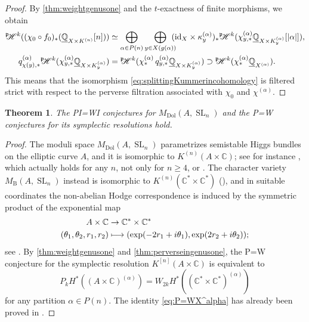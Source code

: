 \documentclass[JEP,XML,SOM,Unicode, NoEqCountersInSection,NoFloatCountersInSection,published]{cedram}
\let\mathcal\mathscr
\newcommand\mto{\mathchoice{\longmapsto}{\mapsto}{\mapsto}{\mapsto}}
\newcommand{\pcH}{{^{\mathfrak{p}}\!\!}\mathcal{H}}
\newtheorem{thm}{Theorem}[section]
\theoremstyle{definition}
\newcommand{\CC}{\mathbb{C}}
\newcommand{\QQ}{\mathbb{Q}}
\newcommand{\Sl}{\operatorname{SL}}
\newcommand{\MDolSlone}{{M}_{\mathrm{Dol}}(A, \Sl_n)}
\newcommand{\MBSlone}{{M}_{\mathrm{B}}(A, \Sl_n)}
\begin{document}
\begin{proof} By \cref{thm:weightgenusone} and the $t$-exactness of finite morphisms, we obtain
\begin{align*}
\pcH^{k}((\chi_0 \circ f_0)_* (\underline{\QQ}_{X \times K^{(n)}}[n])) &\simeq  \bigoplus_{\alpha \in P(n)} \bigoplus_{y \in X(g(\alpha))}\hspace*{-2mm} (\mathrm{id}_X \times \kappa^{(\alpha)}_y)_* \pcH^{k} (\chi^{(\alpha)}_{y,*}\underline{\QQ}_{X \times K^{(\alpha)}_y}[|\alpha|]),
\\
q^{(\alpha)}_{\chi(y), *}\pcH^{k}(\chi^{(\alpha)}_{y,*}\underline{\QQ}_{X \times K^{(\alpha)}_y}) &= \pcH^{k}(\chi^{(\alpha)}_{ *} \,q^{(\alpha)}_{y, *}\underline{\QQ}_{X \times K^{(\alpha)}_y}) \supset \pcH^{k}(\chi^{(\alpha)}_{ *} \underline{\QQ}_{X^{(\alpha)}}).
\end{align*}
This means that the isomorphism \eqref{eq:splittingKummerincohomology} is filtered strict with respect to the perverse filtration associated with $\chi_0$ and $\chi^{(\alpha)}$.
\end{proof}

\begin{thm}\label{thm:PI=IWgenusone}
The PI=WI conjectures for $\MDolSlone$ and the P=W conjectures for its symplectic resolutions hold.
\end{thm}
\begin{proof}
The moduli space $\MDolSlone$ parametrizes semistable Higgs bundles on the elliptic curve $A$, and it is isomorphic to $K^{(n)}(A \times \CC)$; see for instance \cite[Th.\,4.27(v)]{FGPN14}, which actually holds for any $n$, not only for $n \geq 4$, or \cite{Groechenig14}. The character variety $\MBSlone$ instead is isomorphic to $K^{(n)}(\CC^* \times \CC^*)$ (\cf \cite[Proof of Th.\,5.3.2]{MMS}), and in suitable coordinates the non-abelian Hodge correspondence is induced by the symmetric product of the exponential map
\begin{align*}
A \times \CC & \to \CC^* \times \CC^*\\
(\theta_1, \theta_2, r_1, r_2) & \mto (\exp(-2r_1+ i \theta_1), \exp(2r_2+ i \theta_2));
\end{align*}
see \cite[Ex.\,after Prop.\,1.5]{Simpson92}.
By \cref{thm:weightgenusone} and \ref{thm:perverseingenusone}, the P=W conjecture for the symplectic resolution $K^{[n]}(A \times \CC)$ is equivalent to
\begin{equation}\label{eq:P=WX^alpha}
P_k H^*((A \times \CC)^{(\alpha)}) = W_{2k} H^*((\CC^* \times \CC^*)^{(\alpha)})
\end{equation}
for any partition $\alpha\!\in\! P(n)$. The identity \eqref{eq:P=WX^alpha} has already been proved in \cite[Lem.\,3.1.1 \& 3.2.2]{deCataldoHauselMigliorini2013}.
\end{proof}
\end{document}
